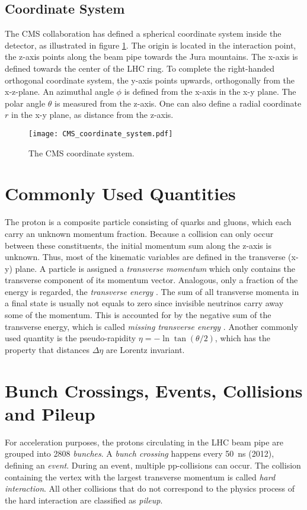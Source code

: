 \subsection{Coordinate System}
The CMS collaboration has defined a spherical coordinate system inside the detector, as illustrated in figure \ref{fig:cms_coordinate_system}. The origin is located in the interaction point, the z-axis points along the beam pipe towards the Jura mountains. The x-axis is defined towards the center of the LHC ring. To complete the right-handed orthogonal coordinate system, the y-axis points upwards, orthogonally from the x-z-plane. 
An azimuthal angle $\phi$ is defined from the x-axis in the x-y plane. The polar angle $\theta$ is measured from the z-axis. One can also define a radial coordinate $r$ in the x-y plane, as distance from the z-axis.\cite[p. 2]{Co2008CMS} 
\begin{figure}
	\centering
	\texttt{[image: CMS\_coordinate\_system.pdf]}
	\caption{The CMS coordinate system.}
	\label{fig:cms_coordinate_system}
\end{figure}

\section{Commonly Used Quantities}
The proton is a composite particle consisting of quarks and gluons, which each carry an unknown momentum fraction. Because a collision can only occur between these constituents, the initial momentum sum along the z-axis is unknown.
Thus, most of the kinematic variables are defined in the transverse (x-y) plane. A particle is assigned a \emph{transverse momentum} \pT which only contains the transverse component of its momentum vector. Analogous, only a fraction of the energy is regarded, the \emph{transverse energy} \ET. 
The sum of all transverse momenta in a final state is usually not equals to zero since invisible neutrinos carry away some of the momentum. This is accounted for by the negative sum of the transverse energy, which is called \emph{missing transverse energy} \MET.
Another commonly used quantity is the pseudo-rapidity $\eta = -\ln \tan(\theta/2)$, which has the property that distances $\Delta\eta$ are Lorentz invariant.

\section{Bunch Crossings, Events, Collisions and Pileup}
For acceleration purposes, the protons circulating in the LHC beam pipe are grouped into 2808 \emph{bunches}\cite[p.4]{EB2008LHC}. A \emph{bunch crossing} happens every \SI{50}{\nano\second} (2012), defining an \emph{event}. During an event, multiple pp-collisions can occur. The collision containing the vertex with the largest transverse momentum is called \emph{hard interaction}. All other collisions that do not correspond to the physics process of the hard interaction are classified as \emph{pileup}.

